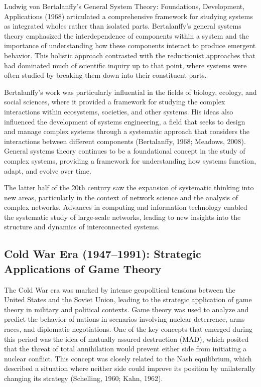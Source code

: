 \documentclass[twocolumn]{article}
\begin{document}
\textcolor{primary}{Ludwig von Bertalanffy’s General System Theory: Foundations, Development, Applications (1968) articulated a comprehensive framework for studying systems as integrated wholes rather than isolated parts. Bertalanffy’s general systems theory emphasized the interdependence of components within a system and the importance of understanding how these components interact to produce emergent behavior. This holistic approach contrasted with the reductionist approaches that had dominated much of scientific inquiry up to that point, where systems were often studied by breaking them down into their constituent parts.}

\textcolor{secondary}{Bertalanffy’s work was particularly influential in the fields of biology, ecology, and social sciences, where it provided a framework for studying the complex interactions within ecosystems, societies, and other systems. His ideas also influenced the development of systems engineering, a field that seeks to design and manage complex systems through a systematic approach that considers the interactions between different components (Bertalanffy, 1968; Meadows, 2008). General systems theory continues to be a foundational concept in the study of complex systems, providing a framework for understanding how systems function, adapt, and evolve over time.}



\textcolor{primary}{The latter half of the 20th century saw the expansion of systematic thinking into new areas, particularly in the context of network science and the analysis of complex networks. Advances in computing and information technology enabled the systematic study of large-scale networks, leading to new insights into the structure and dynamics of interconnected systems.}

\subsection{Cold War Era (1947–1991): Strategic Applications of Game Theory}

\textcolor{primary}{The Cold War era was marked by intense geopolitical tensions between the United States and the Soviet Union, leading to the strategic application of game theory in military and political contexts. Game theory was used to analyze and predict the behavior of nations in scenarios involving nuclear deterrence, arms races, and diplomatic negotiations. One of the key concepts that emerged during this period was the idea of mutually assured destruction (MAD), which posited that the threat of total annihilation would prevent either side from initiating a nuclear conflict. This concept was closely related to the Nash equilibrium, which described a situation where neither side could improve its position by unilaterally changing its strategy (Schelling, 1960; Kahn, 1962).}
\end{document}
